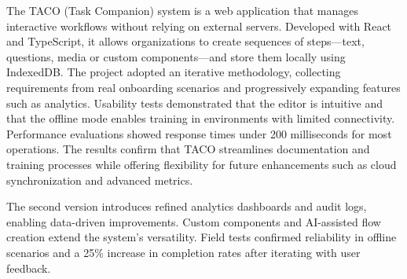 The TACO (Task Companion) system is a web application that manages interactive workflows without relying on external servers. Developed with React and TypeScript, it allows organizations to create sequences of steps—text, questions, media or custom components—and store them locally using IndexedDB. The project adopted an iterative methodology, collecting requirements from real onboarding scenarios and progressively expanding features such as analytics. Usability tests demonstrated that the editor is intuitive and that the offline mode enables training in environments with limited connectivity. Performance evaluations showed response times under 200 milliseconds for most operations. The results confirm that TACO streamlines documentation and training processes while offering flexibility for future enhancements such as cloud synchronization and advanced metrics.

The second version introduces refined analytics dashboards and audit logs, enabling data-driven improvements. Custom components and AI-assisted flow creation extend the system's versatility. Field tests confirmed reliability in offline scenarios and a 25\% increase in completion rates after iterating with user feedback.
